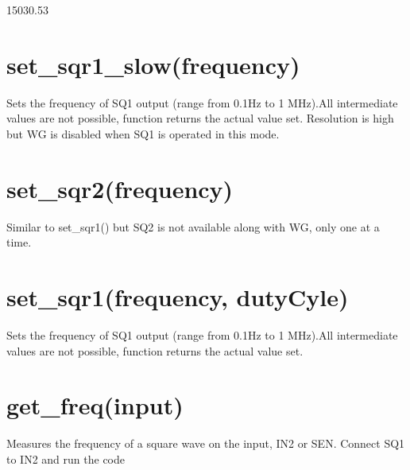 \documentclass[a4paper,12pt,english]{sphinxmanual}
\begin{document}
\begin{sphinxVerbatim}[commandchars=\\\{\}]
 
\end{sphinxVerbatim}

15030.53


\section{set\_sqr1\_slow(frequency)}
\label{\detokenize{9.0:set-sqr1-slow-frequency}}
Sets the frequency of SQ1 output (range from 0.1Hz to 1 MHz).All
intermediate values are not possible, function returns the actual value
set. Resolution is high but WG is disabled when SQ1 is operated in this
mode.

\begin{sphinxVerbatim}[commandchars=\\\{\}]
 
\end{sphinxVerbatim}


\section{set\_sqr2(frequency)}
\label{\detokenize{9.0:set-sqr2-frequency}}
Similar to set\_sqr1() but SQ2 is not available along with WG, only one
at a time.


\section{set\_sqr1(frequency, dutyCyle)}
\label{\detokenize{9.0:set-sqr1-frequency-dutycyle}}
Sets the frequency of SQ1 output (range from 0.1Hz to 1 MHz).All
intermediate values are not possible, function returns the actual value
set.

\begin{sphinxVerbatim}[commandchars=\\\{\}]
            
\end{sphinxVerbatim}


\section{get\_freq(input)}
\label{\detokenize{9.0:get-freq-input}}
Measures the frequency of a square wave on the input, IN2 or SEN.
Connect SQ1 to IN2 and run the code
\end{document}
